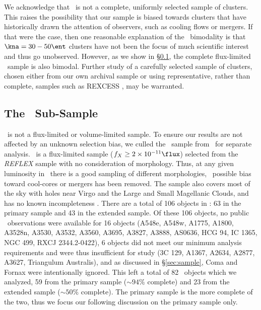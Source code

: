 \documentclass{emulateapj}
\begin{document}
We acknowledge that \accept\ is not a complete, uniformly selected
sample of clusters. This raises the possibility that our sample is
biased towards clusters that have historically drawn the attention of
observers, such as cooling flows or mergers. If that were the case,
then one reasonable explanation of the \kna\ bimodality is that $\kna
= 30-50 \ent$ clusters have not been the focus of much scientific
interest and thus go unobserved. However, as we show in
\S\ref{sec:hifl}, the complete flux-limited \hifl\ sample is also
bimodal. Further study of a carefully selected sample of clusters,
chosen either from our own archival sample or using representative,
rather than complete, samples such as REXCESS \citep{rexcess}, may be
warranted.

\subsection{The \hifl\ Sub-Sample}
\label{sec:hifl}

\accept\ is not a flux-limited or volume-limited sample. To ensure our
results are not affected by an unknown selection bias, we culled the
\hifl\ sample from \accept\ for separate analysis. \hifl\ is a
flux-limited sample ($f_X \ge 2 \times 10^{-11} \flux$) selected from
the {\it{REFLEX}} sample \citep{reflex} with no consideration of
morphology. Thus, at any given luminosity in \hifl\ there is a good
sampling of different morphologies, \ie\ possible bias toward
cool-cores or mergers has been removed. The sample also covers most of
the sky with holes near Virgo and the Large and Small Magellanic
Clouds, and has no known incompleteness
\citep{2007A&A...466..805C}. There are a total of 106 objects in
\hifl: 63 in the primary sample and 43 in the extended sample. Of
these 106 objects, no public \chandra\ observations were available for
16 objects (A548e, A548w, A1775, A1800, A3528n, A3530, A3532, A3560,
A3695, A3827, A3888, AS0636, HCG 94, IC 1365, NGC 499, RXCJ
2344.2-0422), 6 objects did not meet our minimum analysis requirements
and were thus insufficient for study (3C 129, A1367, A2634, A2877,
A3627, Triangulum Australis), and as discussed in \S\ref{sec:sample},
Coma and Fornax were intentionally ignored. This left a total of 82
\hifl\ objects which we analyzed, 59 from the primary sample ($\sim
94\%$ complete) and 23 from the extended sample ($\sim 50\%$
complete). The primary sample is the more complete of the two, thus we
focus our following discussion on the primary sample only.
\end{document}
